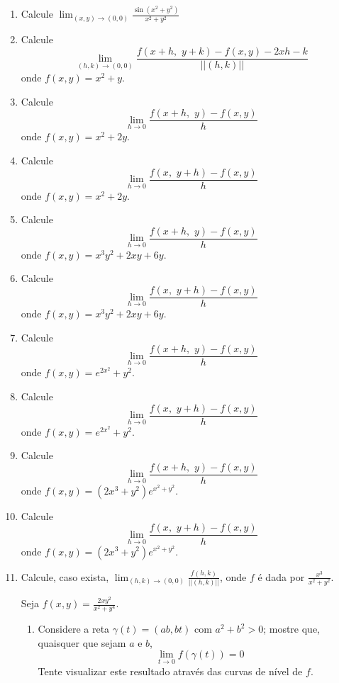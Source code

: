 \documentclass[11pt,a4paper]{article}
\newcommand{\limite}{\displaystyle\lim}
\begin{document}
\begin{enumerate}
\begin{enumerate}
	\end{enumerate}

	\item Calcule $\limite_{(x,y) \to (0,0)} \displaystyle\frac{\sin (x^2 + y^2)}{x^2 + y^2}$
	
	\item Calcule
	$$\limite_{(h,k) \to (0,0)} \displaystyle\frac{f(x + h,\,\, y + k) - f(x,y) - 2xh - k}{||(h,k)||}$$
	onde $f(x,y) = x^2 + y$.

	\item Calcule
	$$\limite_{h \to 0} \displaystyle\frac{f(x + h,\,\, y) - f(x,y)}{h}$$
	onde $f(x,y) = x^2 + 2y$.
	
	\item Calcule
	$$\limite_{h \to 0} \displaystyle\frac{f(x,\,\, y + h) - f(x,y)}{h}$$
	onde $f(x,y) = x^2 + 2y$.
	
	\item Calcule
	$$\limite_{h \to 0} \displaystyle\frac{f(x + h,\,\, y) - f(x,y)}{h}$$
	onde $f(x,y) = x^3y^2 + 2xy + 6y$.	
	
	\item Calcule
	$$\limite_{h \to 0} \displaystyle\frac{f(x,\,\, y + h) - f(x,y)}{h}$$
	onde $f(x,y) = x^3y^2 + 2xy + 6y$.
	
	\item Calcule
	$$\limite_{h \to 0} \displaystyle\frac{f(x + h,\,\, y) - f(x,y)}{h}$$
	onde $f(x,y) = e^{2x^2} + y^2$.
	
	\item Calcule
	$$\limite_{h \to 0} \displaystyle\frac{f(x,\,\, y + h) - f(x,y)}{h}$$
	onde $f(x,y) = e^{2x^2} + y^2$.

	\item Calcule
	$$\limite_{h \to 0} \displaystyle\frac{f(x + h,\,\, y) - f(x,y)}{h}$$
	onde $f(x,y) = (2x^3 + y^2)e^{x^2 + y^2}$.
	
	\item Calcule
	$$\limite_{h \to 0} \displaystyle\frac{f(x,\,\, y + h) - f(x,y)}{h}$$
	onde $f(x,y) = (2x^3 + y^2)e^{x^2 + y^2}$.
	
	\item Calcule, caso exista, $\limite_{(h,k) \to (0,0)} \displaystyle\frac{f(h,k)}{||(h,k)||}$, onde $f$ é dada por $\displaystyle\frac{x^3}{x^2 + y^2}$.
	
	 Seja $f(x,y) = \displaystyle\frac{2xy^2}{x^2 + y^4}$.
	\begin{enumerate}
		\item Considere a reta $\gamma (t) = (ab, bt)$ com $a^2 + b^2 > 0$; mostre que, quaisquer que sejam $a$ e $b$, $$\limite_{t \to 0} f(\gamma (t)) = 0$$
		Tente visualizar este resultado através das curvas de nível de $f$.
		

\end{enumerate}
\end{enumerate}
\end{document}
